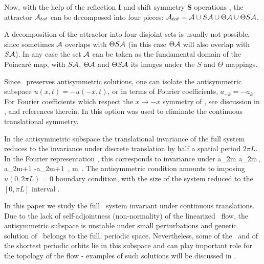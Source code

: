Now, with the help of the 
reflection $\mathbf{I}$ and shift symmetry $ \mathbf{S}$
operations
,
the  attractor ${\cal A}_{tot}$ can be
decomposed into four pieces:
 ${\cal A}_{tot}={\cal A} \cup S {\cal A}  \cup \Theta {\cal A}
  \cup \Theta S {\cal A} $. 

A decomposition
of the attractor into four disjoint sets
is usually not possible, since sometimes $ {\cal A}$ overlaps with
$\Theta S{\cal A} $ (in this case $\Theta  {\cal A}$ will also  overlap with
$S {\cal A} $).
In any case  the set $ {\cal A}$ can be taken as
the fundamental
domain of the Poincar{\'e} map, with $S  {\cal A} $,
$\Theta  {\cal A} $ and $\Theta S  {\cal A} $ its images under the
$S$ and $\Theta$ mappings.



Since \KSe\ preserves
antisymmetric solutions, one can isolate the antisymmetric
subspace 
$u(x,t)=-u(-x,t)$, or in terms of Fourier coefficients,
$a_{-k}= - a_k$. 
For Fourier coefficients which respect the $x \to -x$ symmetry of
\KSe, see discussion in ,
and references therein.
In  
this option was used to eliminate
the continuous translational symmetry.

In the antisymmetric subspace the translational 
invariance of the full system reduces
to the invariance under discrete
translation by half a spatial period $2\pi L$.
In the Fourier representation , 
this corresponds to invariance under 
\beq
a_{2m} \to a_{2m}\,, a_{2m+1} \to -a_{2m+1}
\,, m \in {}
\,.
The antisymmetric condition amounts to imposing
$u(0,2\pi L)=0$ boundary condition, with
the size of the system reduced to
the $[0, \pi L]$ interval .

In this paper we study the full \KS\ system invariant
under continuous translations. Due to the lack of self-adjointness
(non-normality) of the linearized \KS\ flow, 
the antisymmetric subspace
is unstable under small perturbations and generic solution of 
\KSe\ belongs to the full, periodic space. Nevertheless, some of
the \eqva\ and of the shortest periodic orbits lie in this subspace
and can play important role for the topology of the flow - examples
of such solutions will be discussed in .


